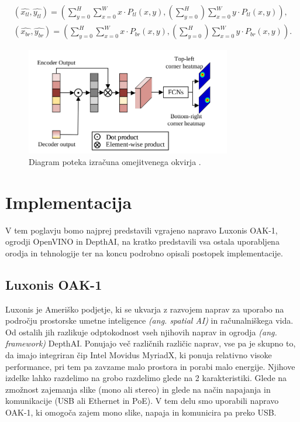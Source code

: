 \documentclass[a4paper,12pt,openright]{book}
\begin{document}
\begin{equation}
    \begin{split}
        (\hat{x_{tl}}, \hat{y_{tl}}) = (\sum_{y=0}^{H} \sum_{x=0}^{W} x \cdot P_{tl}(x,y), (\sum_{y=0}^{H}) \sum_{x=0}^{W} y \cdot P_{tl}(x,y)), \\
        (\hat{x_{br}}, \hat{y_{br}}) = (\sum_{y=0}^{H} \sum_{x=0}^{W} x \cdot P_{br}(x,y), (\sum_{y=0}^{H}) \sum_{x=0}^{W} y \cdot P_{br}(x,y)).
    \end{split}
    \label{eq:8}
\end{equation}

\begin{figure}[htb]
    \begin{center}
        \includegraphics[width=0.8\textwidth]{img/bbox_head.png}
    \end{center}
    \caption{Diagram poteka izračuna omejitvenega okvirja \cite{attention_is_all_you_need}.}
    \label{img:bbox_head}
\end{figure}

\chapter{Implementacija
  \label{ch:2}}
V tem poglavju bomo najprej predstavili vgrajeno napravo Luxonis OAK-1, ogrodji OpenVINO in DepthAI, na kratko predstavili vsa ostala uporabljena orodja in tehnologije ter na koncu podrobno opisali postopek implementacije.

\section{Luxonis OAK-1}
Luxonis je Ameriško podjetje, ki se ukvarja z razvojem naprav za uporabo na področju prostorske umetne inteligence \emph{(ang. spatial AI)} in računalniškega vida. Od ostalih jih razlikuje odptokodnost vseh njihovih naprav in ogrodja \emph{(ang. framework)} DepthAI. Ponujajo več različnih različic naprav, vse pa je skupno to, da imajo integriran čip Intel Movidus MyriadX, ki ponuja relativno visoke performance, pri tem pa zavzame malo prostora in porabi malo energije. Njihove izdelke lahko razdelimo na grobo razdelimo glede na 2 karakteristiki. Glede na zmožnost zajemanja slike (mono ali stereo) in glede na način napajanja in komunikacije (USB ali Ethernet in PoE). V tem delu smo uporabili napravo OAK-1, ki omogoča zajem mono slike, napaja in komunicira pa preko USB.
\end{document}
